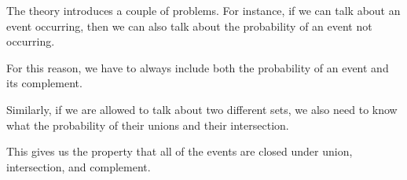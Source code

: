 \documentclass{article}
\begin{document}
The theory introduces a couple of problems. For instance, if we can
talk about an event occurring, then we can also talk about the
probability of an event not occurring.

For this reason, we have to always include both the probability of an
event and its complement.

Similarly, if we are allowed to talk about two different sets, we also
need to know what the probability of their unions and their
intersection.

This gives us the property that all of the events are closed under
union, intersection, and complement.
\end{document}
